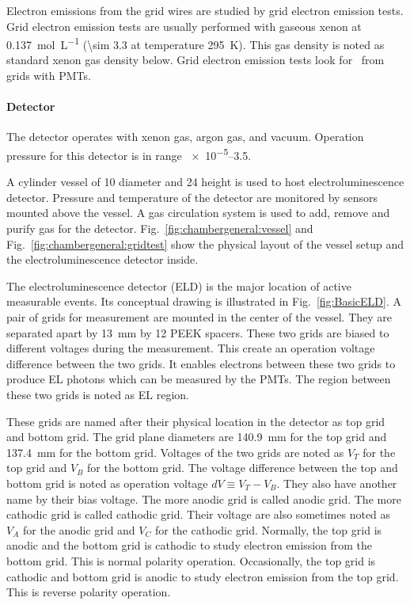 Electron emissions from the grid wires are studied by grid electron emission tests. Grid electron emission tests are usually performed with gaseous xenon at \SI{0.137}{\mole\per\liter} (\SI{\sim 3.3}{\bara} at temperature \SI{295}{\kelvin}). This gas density is noted as standard xenon gas density below. Grid electron emission tests look for \eep\ from grids with PMTs. 

\paragraph{Detector}
The detector operates with xenon gas, argon gas, and vacuum. Operation pressure for this detector is in range \SIrange{e-5}{3.5}{\bara}. 

A cylinder vessel of \SI{10}{\inch} diameter and \SI{24}{\inch} height is used to host electroluminescence detector. Pressure and temperature of the detector are monitored by sensors mounted above the vessel. A gas circulation system is used to add, remove and purify gas for the detector. Fig.~\ref{fig:chambergeneral:vessel} and Fig.~\ref{fig:chambergeneral:gridtest} show the physical layout of the vessel setup and the electroluminescence detector inside. 

The electroluminescence detector (ELD) is the major location of active measurable events. Its conceptual drawing is illustrated in Fig.~\ref{fig:BasicELD}. A pair of grids for measurement are mounted in the center of the vessel. They are separated apart by \SI{13}{\mm} by 12 PEEK spacers. These two grids are biased to different voltages during the measurement. This create an operation voltage difference between the two grids. It enables electrons between these two grids to produce EL photons which can be measured by the PMTs. The region between these two grids is noted as EL region. 

These grids are named after their physical location in the detector as top grid and bottom grid. The grid plane diameters are \SI{140.9}{\mm} for the top grid and \SI{137.4}{\mm} for the bottom grid. Voltages of the two grids are noted as $V_{T}$ for the top grid and $V_{B}$ for the bottom grid. The voltage difference between the top and bottom grid is noted as operation voltage $dV \equiv V_{T} - V_{B}$. They also have another name by their bias voltage. The more anodic grid is called anodic grid. The more cathodic grid is called cathodic grid. Their voltage are also sometimes noted as $V_{A}$ for the anodic grid and $V_{C}$ for the cathodic grid. Normally, the top grid is anodic and the bottom grid is cathodic to study electron emission from the bottom grid. This is normal polarity operation. Occasionally, the top grid is cathodic and bottom grid is anodic to study electron emission from the top grid. This is reverse polarity operation. 

